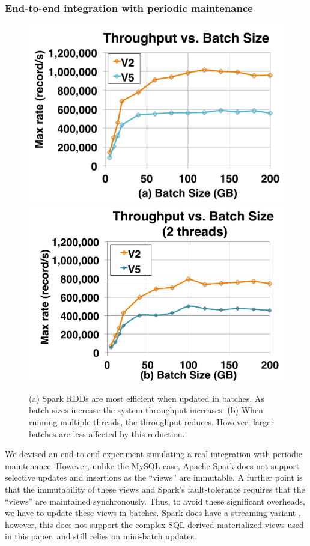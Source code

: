 \subsubsection{End-to-end integration with periodic maintenance}
\begin{figure}[t]
\centering
 \includegraphics[scale=0.13]{exp/con_1.pdf}
 \includegraphics[scale=0.13]{exp/con_2.pdf}\vspace{-1em}
 \caption{(a) Spark RDDs are most efficient when updated in batches. As batch sizes increase the system throughput increases. (b) When running multiple threads, the throughput reduces. However, larger batches are less affected by this reduction. \label{conv-2}}
\end{figure}

We devised an end-to-end experiment simulating a real integration with periodic maintenance.
However, unlike the MySQL case, Apache Spark does not support selective updates and insertions as the ``views'' are immutable.
A further point is that the immutability of these views and Spark's fault-tolerance requires that the ``views'' are maintained synchronously.
Thus, to avoid these significant overheads, we have to update these views in batches.
Spark does have a streaming variant \cite{zaharia2012discretized}, however, this does not support the complex SQL derived materialized views used in this paper, and still relies on mini-batch updates.

